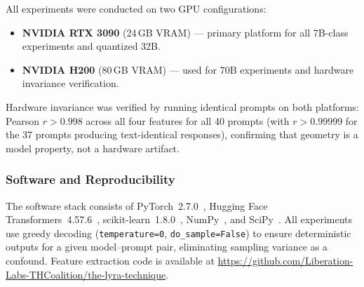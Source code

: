 All experiments were conducted on two GPU configurations:
\begin{itemize}[leftmargin=2em]
  \item \textbf{NVIDIA RTX 3090} (24\,GB VRAM) --- primary platform for all 7B-class experiments and quantized 32B.
  \item \textbf{NVIDIA H200} (80\,GB VRAM) --- used for 70B experiments and hardware invariance verification.
\end{itemize}
Hardware invariance was verified by running identical prompts on both platforms: Pearson $r > 0.998$ across all four features for all 40 prompts (with $r > 0.99999$ for the 37 prompts producing text-identical responses), confirming that \kvcache geometry is a model property, not a hardware artifact.

\subsubsection{Software and Reproducibility}

The software stack consists of PyTorch~2.7.0~\cite{pytorch}, Hugging Face Transformers~4.57.6~\cite{wolf2020transformers}, scikit-learn~1.8.0~\cite{scikit-learn}, NumPy~\cite{numpy}, and SciPy~\cite{scipy}.
All experiments use greedy decoding (\texttt{temperature=0}, \texttt{do\_sample=False}) to ensure deterministic outputs for a given model--prompt pair, eliminating sampling variance as a confound.
Feature extraction code is available at \url{https://github.com/Liberation-Labs-THCoalition/the-lyra-technique}.
